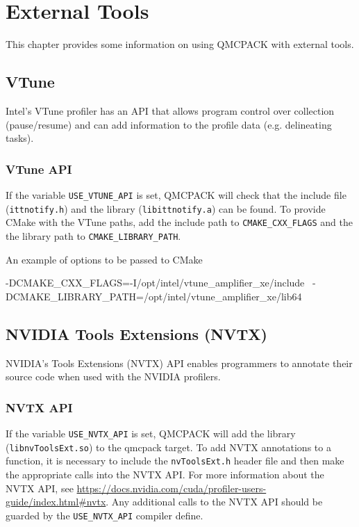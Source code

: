 \chapter{External Tools}
\label{chap:external_tools}
This chapter provides some information on using QMCPACK with external tools.

\section{VTune}

Intel's VTune profiler has an API that allows program control over collection (pause/resume) and can add information to the profile data (e.g. delineating tasks).

\subsection{VTune API}

If the variable \texttt{USE\_VTUNE\_API} is set, QMCPACK will check that the
include file (\texttt{ittnotify.h}) and the library (\texttt{libittnotify.a}) can
be found.
To provide CMake with the VTune paths, add the include path to \texttt{CMAKE\_CXX\_FLAGS} and the the library path to \texttt{CMAKE\_LIBRARY\_PATH}.

An example of options to be passed to CMake
\begin{shade}
 -DCMAKE_CXX_FLAGS=-I/opt/intel/vtune_amplifier_xe/include \
 -DCMAKE_LIBRARY_PATH=/opt/intel/vtune_amplifier_xe/lib64
\end{shade}

\section{NVIDIA Tools Extensions (NVTX)}

NVIDIA's Tools Extensions (NVTX) API enables programmers to annotate their source code when used with the NVIDIA profilers.

\subsection{NVTX API}

If the variable \texttt{USE\_NVTX\_API} is set, QMCPACK will add the library (\texttt{libnvToolsExt.so}) to the qmcpack target. To add NVTX annotations
to a function, it is necessary to include the \texttt{nvToolsExt.h} header file and then make the appropriate calls into the NVTX API. For more information
about the NVTX API, see \url{https://docs.nvidia.com/cuda/profiler-users-guide/index.html#nvtx}. Any additional calls to the NVTX API should be guarded by
the \texttt{USE\_NVTX\_API} compiler define.

